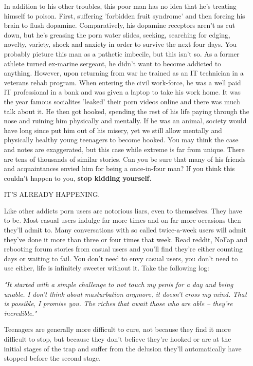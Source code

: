 \documentclass[easypeasy]{subfiles}
\begin{document}
In addition to his other troubles, this poor man has no idea that he's treating himself to poison. First, suffering 'forbidden fruit syndrome' and then forcing his brain to flush dopamine. Comparatively, his dopamine receptors aren't as cut down, but he's greasing the porn water slides, seeking, searching for edging, novelty, variety, shock and anxiety in order to survive the next four days. You probably picture this man as a pathetic imbecile, but this isn't so. As a former athlete turned ex-marine sergeant, he didn't want to become addicted to anything. However, upon returning from war he trained as an IT technician in a veterans rehab program. When entering the civil work-force, he was a well paid IT professional in a bank and was given a laptop to take his work home. It was the year famous socialites 'leaked' their porn videos online and there was much talk about it. He then got hooked, spending the rest of his life paying through the nose and ruining him physically and mentally. If he was an animal, society would have long since put him out of his misery, yet we still allow mentally and physically healthy young teenagers to become hooked. You may think the case and notes are exaggerated, but this case while extreme is far from unique. There are tens of thousands of similar stories. Can you be sure that many of his friends and acquaintances envied him for being a once-in-four man? If you think this couldn't happen to you, \textbf{stop kidding yourself.}

{\huge IT'S ALREADY HAPPENING.}

Like other addicts porn users are notorious liars, even to themselves. They have to be. Most casual users indulge far more times and on far more occasions then they'll admit to. Many conversations with so called twice-a-week users will admit they've done it more than three or four times that week. Read reddit, NoFap and rebooting forum stories from casual users and you'll find they're either counting days or waiting to fail. You don't need to envy casual users, you don't need to use either, life is infinitely sweeter without it. Take the following log:

  \textit{"It started with a simple challenge to not touch my penis for a day and being unable. I don't think about masturbation anymore, it doesn't cross my mind. That is possible, I promise you. The riches that await those who are able -- they're incredible."}

Teenagers are generally more difficult to cure, not because they find it more difficult to stop, but because they don't believe they're hooked or are at the initial stages of the trap and suffer from the delusion they'll automatically have stopped before the second stage.
\end{document}
